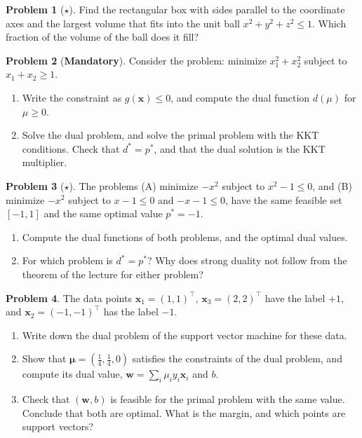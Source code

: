 \documentclass[11pt]{article}
\theoremstyle{definition}
\newtheorem{problem}{Problem}[section]
\newcommand{\mandatory}{\textcolor{red!70!black}{\textbf{Mandatory}}}
\begin{document}
\begin{problem}[$\star$]\label{pr:box-sphere}
    Find the rectangular box with sides parallel to the coordinate axes and the largest volume that fits into the unit ball $x^2 + y^2 + z^2 \leq 1$. Which fraction of the volume of the ball does it fill?
\end{problem}

\begin{problem}[\mandatory]\label{pr:dual-practice}
    Consider the problem: minimize $x_1^2 + x_2^2$ subject to $x_1 + x_2 \geq 1$.
    \begin{enumerate}[label=(\alph*)]
        \item Write the constraint as $g(\mathbf{x}) \leq 0$, and compute the dual function $d(\mu)$ for $\mu \geq 0$.
        \item Solve the dual problem, and solve the primal problem with the KKT conditions. Check that $d^* = p^*$, and that the dual solution is the KKT multiplier.
    \end{enumerate}
\end{problem}

\begin{problem}[$\star$]\label{pr:duality-gap}
    The problems (A) minimize $-x^2$ subject to $x^2 - 1 \leq 0$, and (B) minimize $-x^2$ subject to $x - 1 \leq 0$ and $-x - 1 \leq 0$, have the same feasible set $[-1, 1]$ and the same optimal value $p^* = -1$.
    \begin{enumerate}[label=(\alph*)]
        \item Compute the dual functions of both problems, and the optimal dual values.
        \item For which problem is $d^* = p^*$? Why does strong duality not follow from the theorem of the lecture for either problem?
    \end{enumerate}
\end{problem}

\begin{problem}\label{pr:svm-dual-practice}
    The data points $\mathbf{x}_1 = (1, 1)^\top$, $\mathbf{x}_3 = (2, 2)^\top$ have the label $+1$, and $\mathbf{x}_2 = (-1, -1)^\top$ has the label $-1$.
    \begin{enumerate}[label=(\alph*)]
        \item Write down the dual problem of the support vector machine for these data.
        \item Show that $\boldsymbol{\mu} = (\frac{1}{4}, \frac{1}{4}, 0)$ satisfies the constraints of the dual problem, and compute its dual value, $\mathbf{w} = \sum_i \mu_iy_i\mathbf{x}_i$ and $b$.
        \item Check that $(\mathbf{w}, b)$ is feasible for the primal problem with the same value. Conclude that both are optimal. What is the margin, and which points are support vectors?
    \end{enumerate}
\end{problem}
\end{document}
